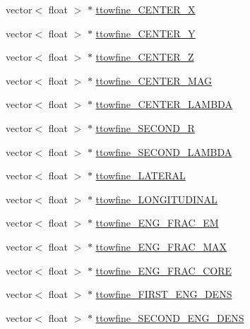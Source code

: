 \begin{DoxyCompactItemize}
\item 
vector$<$ float $>$ $\ast$ \hyperlink{classCollectionTree_aec941489620ddfe8fc743931a485a465}{ttowfine\+\_\+\+C\+E\+N\+T\+E\+R\+\_\+X}
\item 
vector$<$ float $>$ $\ast$ \hyperlink{classCollectionTree_ad0fbedcf419b9c5e3355498236bdb87b}{ttowfine\+\_\+\+C\+E\+N\+T\+E\+R\+\_\+Y}
\item 
vector$<$ float $>$ $\ast$ \hyperlink{classCollectionTree_a0e9fd83e1223b2b25d7fc405aeac080f}{ttowfine\+\_\+\+C\+E\+N\+T\+E\+R\+\_\+Z}
\item 
vector$<$ float $>$ $\ast$ \hyperlink{classCollectionTree_aecd4998f34d6a70a2595b00e820f455f}{ttowfine\+\_\+\+C\+E\+N\+T\+E\+R\+\_\+\+M\+AG}
\item 
vector$<$ float $>$ $\ast$ \hyperlink{classCollectionTree_a096ccfab9f885afea34a25358819b227}{ttowfine\+\_\+\+C\+E\+N\+T\+E\+R\+\_\+\+L\+A\+M\+B\+DA}
\item 
vector$<$ float $>$ $\ast$ \hyperlink{classCollectionTree_adadc8dba2069a88c46c7af097e1dc7cf}{ttowfine\+\_\+\+S\+E\+C\+O\+N\+D\+\_\+R}
\item 
vector$<$ float $>$ $\ast$ \hyperlink{classCollectionTree_a11cf58e11133cca8bb2117190e1804f8}{ttowfine\+\_\+\+S\+E\+C\+O\+N\+D\+\_\+\+L\+A\+M\+B\+DA}
\item 
vector$<$ float $>$ $\ast$ \hyperlink{classCollectionTree_a3218771a1016c98dea1cc8d67d192c95}{ttowfine\+\_\+\+L\+A\+T\+E\+R\+AL}
\item 
vector$<$ float $>$ $\ast$ \hyperlink{classCollectionTree_a5c5c9232f81af1b4af760ab490ec2874}{ttowfine\+\_\+\+L\+O\+N\+G\+I\+T\+U\+D\+I\+N\+AL}
\item 
vector$<$ float $>$ $\ast$ \hyperlink{classCollectionTree_a0c5c56e6b0bd4446676aeca931c62442}{ttowfine\+\_\+\+E\+N\+G\+\_\+\+F\+R\+A\+C\+\_\+\+EM}
\item 
vector$<$ float $>$ $\ast$ \hyperlink{classCollectionTree_aacc21933f6facaa0ea87ccc2ae464b3a}{ttowfine\+\_\+\+E\+N\+G\+\_\+\+F\+R\+A\+C\+\_\+\+M\+AX}
\item 
vector$<$ float $>$ $\ast$ \hyperlink{classCollectionTree_a5f0a689844fd28e2fb6f382e99138810}{ttowfine\+\_\+\+E\+N\+G\+\_\+\+F\+R\+A\+C\+\_\+\+C\+O\+RE}
\item 
vector$<$ float $>$ $\ast$ \hyperlink{classCollectionTree_ae781cdd995dd44fa0e9d187de0263873}{ttowfine\+\_\+\+F\+I\+R\+S\+T\+\_\+\+E\+N\+G\+\_\+\+D\+E\+NS}
\item 
vector$<$ float $>$ $\ast$ \hyperlink{classCollectionTree_ad73cf6d757c18c3ae5f31f176d19e686}{ttowfine\+\_\+\+S\+E\+C\+O\+N\+D\+\_\+\+E\+N\+G\+\_\+\+D\+E\+NS}

\end{DoxyCompactItemize}
